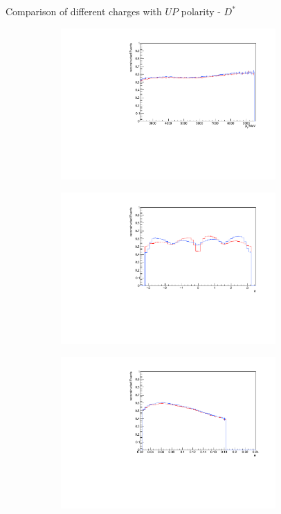 \documentclass[11pt]{beamer}
\begin{document}
\begin{frame}{Comparison of different charges with $UP$ polarity - $D^*$}
\begin{figure}
\begin{subfigure}{0.45\textwidth}
\includegraphics[width=0.9\textwidth]{up_pdf/combined/h_pt_reco_Dst.pdf}
\end{subfigure}
\begin{subfigure}{0.45\textwidth}
\includegraphics[width=0.9\textwidth]{up_pdf/combined/h_phi_reco_Dst.pdf}
\end{subfigure}
\begin{subfigure}{0.45\textwidth}
\includegraphics[width=0.9\textwidth]{up_pdf/combined/h_theta_reco_Dst.pdf}

\end{subfigure}
\end{figure}
\end{frame}
\end{document}

